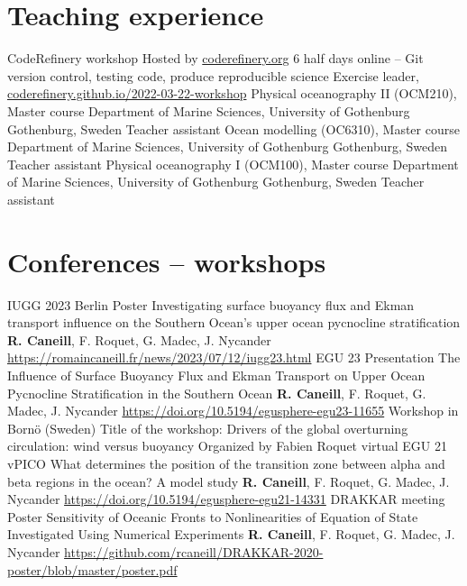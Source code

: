 \documentclass[11pt,a4paper,roman]{moderncv}
\begin{document}
        
\section{Teaching experience}
        {CodeRefinery workshop}
        {Hosted by \href{https://coderefinery.org}{coderefinery.org}}
        {6 half days online -- Git version control, testing code, produce reproducible science}
        {Exercise leader, \href{https://coderefinery.github.io/2022-03-22-workshop}{coderefinery.github.io/2022-03-22-workshop}}
        {}
        {Physical oceanography II (OCM210), Master course}
        {Department of Marine Sciences, University of Gothenburg}
        {Gothenburg, Sweden}
        {Teacher assistant}
        {}
        {Ocean modelling (OC6310), Master course}
        {Department of Marine Sciences, University of Gothenburg}
        {Gothenburg, Sweden}
        {Teacher assistant}
        {}
        {Physical oceanography I (OCM100), Master course}
        {Department of Marine Sciences, University of Gothenburg}
        {Gothenburg, Sweden}
        {Teacher assistant}
        {}


\nocite{*}



\section{Conferences -- workshops}
        {IUGG 2023 Berlin}
        {Poster}
        {Investigating surface buoyancy flux and Ekman transport influence on the Southern Ocean's upper ocean pycnocline stratification}
        {\textbf{R. Caneill}, F. Roquet, G. Madec, J. Nycander}
        {\href{https://romaincaneill.fr/news/2023/07/12/iugg23.html}{https://romaincaneill.fr/news/2023/07/12/iugg23.html}}
        {EGU 23}
        {Presentation}
        {The Influence of Surface Buoyancy Flux and Ekman Transport on Upper Ocean Pycnocline Stratification in the Southern Ocean}
        {\textbf{R. Caneill}, F. Roquet, G. Madec, J. Nycander}
        {\href{https://doi.org/10.5194/egusphere-egu23-11655}{https://doi.org/10.5194/egusphere-egu23-11655}}
        {Workshop in Bornö (Sweden)}
        {Title of the workshop:
        Drivers of the global overturning circulation: wind versus buoyancy}
        {Organized by Fabien Roquet}
        {}{}
        {virtual EGU 21}
        {vPICO}
        {What determines the position of the transition zone between alpha and beta regions in the ocean? A model study}
        {\textbf{R. Caneill}, F. Roquet, G. Madec, J. Nycander}
        {\href{https://doi.org/10.5194/egusphere-egu21-14331}{https://doi.org/10.5194/egusphere-egu21-14331}}
        {DRAKKAR meeting}
        {Poster}
        {Sensitivity of Oceanic Fronts to Nonlinearities of Equation of State Investigated Using Numerical Experiments}
        {\textbf{R. Caneill}, F. Roquet, G. Madec, J. Nycander}
        {\href{https://github.com/rcaneill/DRAKKAR-2020-poster/blob/master/poster.pdf}{https://github.com/rcaneill/DRAKKAR-2020-poster/blob/master/poster.pdf}}
\end{document}
